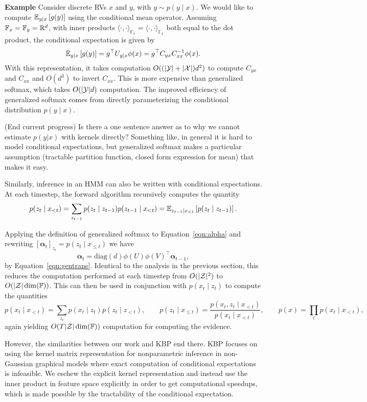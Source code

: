 \documentclass{article}
\begin{document}
\textbf{Example}
Consider discrete RVs $x$ and $y$, with $y\sim p(y\mid x)$.
We would like to compute $\mathbb{E}_{y\mid x}\left[g(y)\right]$ using the conditional mean operator.
Assuming $\mathbb{F}_x=\mathbb{F}_y=\mathbb{R}^d$,
with inner products
$\langle\cdot,\cdot\rangle_{\mathbb{F}_x}=\langle\cdot,\cdot\rangle_{\mathbb{F}_x}$
both equal to the dot product,
the conditional expectation is given by
$$\mathbb{E}_{y\mid x}\left[g(y)\right] = g^\top U_{y\mid x}\phi(x) = g^\top C_{yx}C_{xx}^{-1}\phi(x).$$
With this representation, it takes computation $O((|\mathcal{Y}|+|\mathcal{X}|)d^2)$
to compute $C_{yx}$ and $C_{xx}$ and $O(d^3)$ to invert $C_{xx}$.
This is more expensive than generalized softmax,
which takes $O(|\mathcal{Y}|d)$ computation.
The improved efficiency of generalized softmax comes from directly parameterizing
the conditional distribution $p(y\mid x)$.

(End current progress)
Is there a one sentence answer as to why we cannot estimate $p(y|x)$ with kernels directly?
Something like, in general it is hard to model conditional expectations, but
generalized softmax makes a particular assumption (tractable partition function,
closed form expression for mean) that makes it easy.

Similarly, inference in an HMM can also be written with conditional expectations.
At each timestep, the forward algorithm recursively computes the quantity
\begin{equation}
\label{eqn:alpha}
p(z_t \mid x_{<t})
= \sum_{z_{t-1}} p(z_t \mid z_{t-1})p(z_{t-1}\mid x_{<t})
= \mathbb{E}_{z_{t-1}\mid x_{<t}}\left[p(z_t \mid z_{t-1})\right].
\end{equation}

Applying the definition of generalized softmax to Equation~\ref{eqn:alpha}
and rewriting $[\bm\alpha_t]_{z_t} = p(z_t \mid x_{\le t})$
we have
\begin{equation}
\bm\alpha_t = \textrm{diag}(d)\phi(U)\phi(V)^\top\bm\alpha_{t-1},
\end{equation}
by Equation~\ref{eqn:gentrans}.
Identical to the analysis in the previous section, this reduces the computation
performed at each timestep from $O(|\mathcal{Z}|^2)$ to $O(|\mathcal{Z}|\dim(\mathbb{F}))$.
This can then be used in conjunction with $p(x_t \mid z_t)$ to compute
the quantities
$$
p(x_t \mid x_{<t}) = \sum_{z_t}p(x_t \mid z_t)p(z_t \mid z_{<t}),
\qquad
p(z_t \mid x_{\le t}) = \frac{p(x_t, z_t \mid x_{<t})}{p(x_t \mid x_{<t})},
\qquad
p(x) = \prod_t p(x_t \mid x_{<t}),
$$
again yielding $O(T|\mathcal{Z}|\dim(\mathbb{F}))$ computation for computing the evidence.

However, the similarities between our work and KBP end there.
KBP focuses on using the kernel matrix representation for nonparametric inference
in non-Gaussian graphical models where exact computation of conditional expectations is
infeasible.
We eschew the explicit kernel representation and
instead use the inner product in feature space explicitly in order to get
computational speedups,
which is made possible by the tractability of the conditional expectation.
\end{document}
